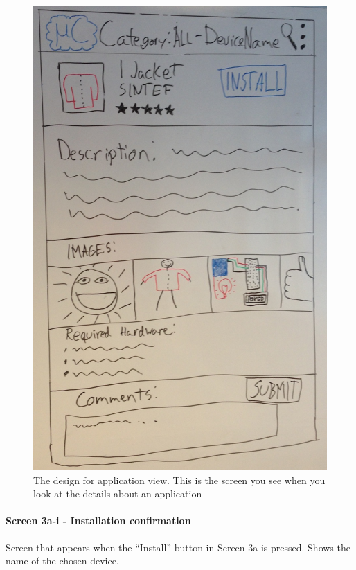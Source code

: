 \begin{figure}[H]
\centering
\includegraphics[scale=0.2]{images/Design_guide/Screen3a.png}
\caption[Screen 3a - Application view]{The design for application view. This is the screen you see when you look at the details about an application}
\label{fig:screen3a}
\end{figure}


\paragraph{Screen 3a-i - Installation confirmation}
Screen that appears when the ``Install'' button in Screen 3a is pressed. Shows the name of the chosen device.

